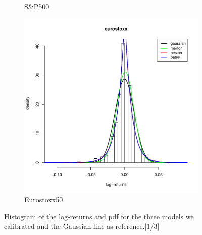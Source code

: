 \begin{figure}
\begin{subfigure}{0.44\textwidth}
		\caption{S\&P500}
	\end{subfigure}
	\begin{subfigure}{0.44\textwidth}
		\centering
		\includegraphics[width=\linewidth]{Images/hist_eurostoxx.pdf}
		\caption{Eurostoxx50}
	\end{subfigure}
	\caption{Histogram of the log-returns and pdf for the three models we calibrated and the Gaussian line as reference.[1/3]}
	\label{fig:hist_1}
\end{figure}





